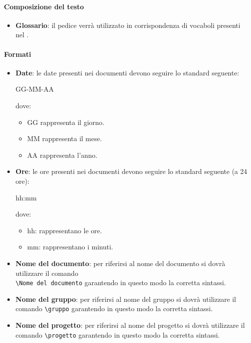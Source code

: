\paragraph{Composizione del testo}
\begin{itemize}
   \item \textbf{Glossario}: il pedice \termine{} verrà utilizzato in corrispondenza di vocaboli presenti nel \textit{\glossario}.
\end{itemize}

\paragraph{Formati}
\begin{itemize}
   \item \textbf{Date}: le date presenti nei documenti devono seguire lo standard seguente:
   \begin{center}
     GG-MM-AA
   \end{center}
   dove:
   \begin{itemize}
   		\item GG rappresenta il giorno.
     	\item MM rappresenta il mese.
     	\item AA rappresenta l'anno.
   \end{itemize}
   \item \textbf{Ore}: le ore presenti nei documenti devono seguire lo standard seguente (a 24 ore):
   \begin{center}
     hh:mm
   \end{center}
   dove:
   \begin{itemize}
     \item hh: rappresentano le ore.
     \item mm: rappresentano i minuti.
   \end{itemize}
   \item \textbf{Nome del documento}: per riferirsi al nome del documento si
   dovrà utilizzare il comando  \\ \verb|\Nome del documento| garantendo in questo modo la corretta sintassi.
   \item \textbf{Nome del gruppo}: per riferirsi al nome del gruppo si dovrà
   utilizzare il comando  \verb|\gruppo| garantendo in questo modo la corretta sintassi.
   \item \textbf{Nome del progetto}: per riferirsi al nome del progetto si dovrà
   utilizzare il comando  \verb|\progetto| garantendo in questo modo la corretta sintassi.

\end{itemize}
